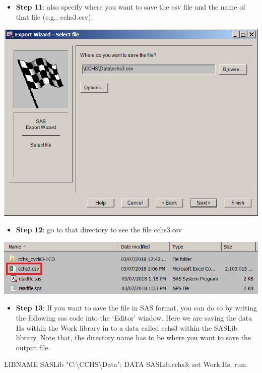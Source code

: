 \documentclass[
]{book}
\newenvironment{Shaded}{\begin{snugshade}}{\end{snugshade}}
\newcommand{\NormalTok}[1]{#1}
\newcommand{\StringTok}[1]{\textcolor[rgb]{0.31,0.60,0.02}{#1}}
\providecommand{\tightlist}{%
  \setlength{\itemsep}{0pt}\setlength{\parskip}{0pt}}
\begin{document}
\begin{itemize}
\tightlist
\item
  \textbf{Step 11}: also specify where you want to save the csv file and the name of that file (e.g., cchs3.csv).
\end{itemize}

\includegraphics[width=0.65\linewidth]{images/abacus24}

\begin{itemize}
\tightlist
\item
  \textbf{Step 12}: go to that directory to see the file cchs3.csv
\end{itemize}

\includegraphics[width=0.65\linewidth]{images/abacus25}

\begin{itemize}
\tightlist
\item
  \textbf{Step 13}: If you want to save the file in SAS format, you can do so by writing the following sas code into the `Editor' window. Here we are saving the data Hs within the Work library in to a data called cchs3 within the SASLib library. Note that, the directory name has to be where you want to save the output file.
\end{itemize}

\begin{Shaded}
\begin{Highlighting}[]
\NormalTok{LIBNAME SASLib }\StringTok{"C:\textbackslash{}CCHS\textbackslash{}Data"}\NormalTok{;}
\NormalTok{DATA SASLib.cchs3;}
\NormalTok{    set Work.Hs;}
\NormalTok{run;}
\end{Highlighting}
\end{Shaded}
\end{document}
